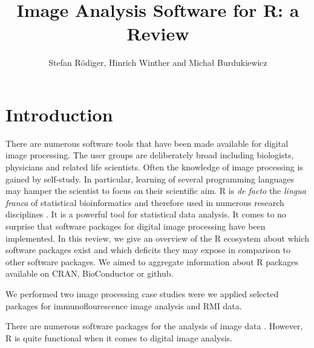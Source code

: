\title{Image Analysis Software for R: a Review}
\author{Stefan R\"{o}diger, Hinrich Winther and Micha\l{} Burdukiewicz}

\maketitle


\section{Introduction}
There are numerous software tools that have been made available for digital 
image processing. The user groups are deliberately broad including biologists, 
physicians and related life scientists. Often the knowledge of image processing 
is gained by self-study. In particular, learning of several programming 
languages may hamper the scientist to focus on their scientific aim. R \citep{R} is \textit{de facto} 
the \textit{lingua franca} of statistical bioinformatics and 
therefore used in numerous research disciplines \citep{rodiger_r_2015}. It is a 
powerful tool for statistical data analysis. It comes to no 
surprise that software packages for digital image processing have been 
implemented. In this review, we give an overview of the R ecosystem about 
which software packages exist and which deficits they may expose in 
comparison to other software packages. We aimed to aggregate information about 
R packages available on CRAN, BioConductor or github.

We performed two image processing case studies were we applied selected 
packages for immunoflourescence image analysis and RMI data. 

There are numerous software packages for the analysis of image data 
\citep{wiesmann_review_2015}. However, R is quite functional when it comes to 
digital image analysis.

